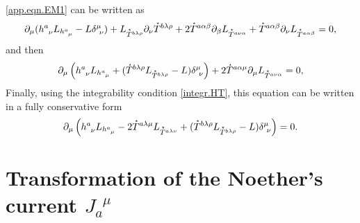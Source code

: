 \documentclass[
10pt, %
a4paper, %
oneside, %
headinclude,footinclude, %
BCOR5mm, %
]{scrartcl}
\newcommand{\pd}[1]{\partial_{#1}}
\newcommand{\tetrsymbol}{h}
\newcommand{\tetr}[2]{\tetrsymbol^{#1}_{\phantom{#1}#2}}
\newcommand{\Laghodge}{L}%
\newcommand{\HDT}[1]{\accentset{\star}{T}^{#1}}
\newcommand{\NC}[2]{J^{\phantom{#1}#2}_{#1}}
\begin{document}
\eqref{app.eqn.EM1} can be written as
\begin{equation}
\pd{\mu}(\tetr{a}{\nu}\Laghodge_{\tetr{a}{\mu}} - L \delta^\mu_{\ \nu}) +
\Laghodge_{\HDT{b\lambda\rho}}\pd{\nu}\HDT{b\lambda\rho} +
2\HDT{a\alpha\beta}\pd{\beta}\Laghodge_{\HDT{a\nu\alpha}} + 
\HDT{a\alpha\beta}\pd{\nu}\Laghodge_{\HDT{a\alpha\beta}} = 0,
\end{equation} 
and then
\begin{equation}
\pd{\mu}\left(\tetr{a}{\nu}\Laghodge_{\tetr{a}{\mu}} + 
(\HDT{b\lambda\rho}\Laghodge_{\HDT{b\lambda\rho}}- 
L) \delta^\mu_{\ \nu} \right) +
2\HDT{a\alpha\mu}\pd{\mu}\Laghodge_{\HDT{a\nu\alpha}} = 0,
\end{equation} 
Finally, using the integrability condition \eqref{integr.HT}, this equation can be written in a 
fully conservative form
\begin{equation}
\pd{\mu}\left(\tetr{a}{\nu}\Laghodge_{\tetr{a}{\mu}} -
2\HDT{a\lambda\mu}\Laghodge_{\HDT{a\lambda\nu}}
+
(\HDT{b\lambda\rho}\Laghodge_{\HDT{b\lambda\rho}}- 
L) \delta^\mu_{\ \nu} \right) = 0.
\end{equation} 




\section{Transformation of the Noether's current $ \NC{a}{\mu} $}\label{app.sec.NC}
\end{document}
